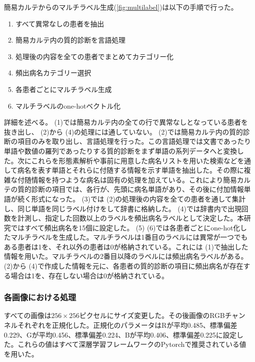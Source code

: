 簡易カルテからのマルチラベル生成(\ref{fig:multilabel})は以下の手順で行った。
\begin{enumerate}
    \item すべて異常なしの患者を抽出
    \item 簡易カルテ内の質的診断を言語処理
    \item 処理後の内容を全ての患者でまとめてカテゴリー化
    \item 頻出病名カテゴリー選択
    \item 各患者ごとにマルチラベル生成
    \item マルチラベルのone-hotベクトル化
\end{enumerate}
詳細を述べる。 (1)では簡易カルテ内の全ての行で異常なしとなっている患者を抜き出し、 (2)から (4)の処理には通していない。 (2)では簡易カルテ内の質的診断の項目のみを取り出し、言語処理を行った。この言語処理では文書であったり単語や数値の羅列であったりする質的診断をまず単語の系列データへと変換した。次にこれらを形態素解析や事前に用意した病名リストを用いた検索などを通して病名を表す単語とそれらに付随する情報を示す単語を抽出した。その際に複雑な付随情報を持つような病名は固有の処理を加えている。これにより簡易カルテの質的診断の項目では、各行が、先頭に病名単語があり、その後に付加情報単語が続く形式になった。 (3)では (2)の処理後の内容を全ての患者を通して集計し、同じ単語を同じラベル付けをして辞書に格納した。 (4)では辞書内で出現回数を計測し、指定した回数以上のラベルを頻出病名ラベルとして決定した。本研究ではすべて頻出病名を15個に設定した。 (5) (6)では各患者ごとにone-hot化したマルチラベルを生成した。マルチラベルは1番目のラベルには異常が一つでもある患者は1を、それ以外の患者は0が格納されている。これには (1)で抽出した情報を用いた。マルチラベルの2番目以降のラベルには頻出病名ラベルがある。 (2)から (4)で作成した情報を元に、各患者の質的診断の項目に頻出病名が存在する場合は1を、存在しない場合は0が格納されている。
\subsubsection{各画像における処理}
すべての画像は$256 \times 256$ピクセルにサイズ変更した。その後画像のRGBチャンネルそれぞれを正規化した。正規化のパラメータはRが平均0.485、標準偏差0.229、Gが平均0.456、標準偏差0.224、Bが平均0.406、標準偏差0.225に設定した。これらの値はすべて深層学習フレームワークのPytorchで推奨されている値を用いた。
